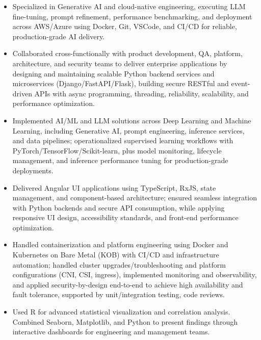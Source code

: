 \documentclass[11pt,letterpaper]{article}
\begin{document}
\begin{itemize}
  \item Specialized in Generative AI and cloud-native engineering, executing LLM fine-tuning, prompt
        refinement, performance benchmarking, and deployment across AWS/Azure using Docker, Git,
        VSCode, and CI/CD for reliable, production-grade AI delivery.

  \item Collaborated cross-functionally with product development, QA, platform, architecture, and
        security teams to deliver enterprise applications by designing and maintaining scalable Python
        backend services and microservices (Django/FastAPI/Flask), building secure RESTful and
        event-driven APIs with async programming, threading, reliability, scalability, and
        performance optimization.

  \item Implemented AI/ML and LLM solutions across Deep Learning and Machine Learning, including
        Generative AI, prompt engineering, inference services, and data pipelines; operationalized
        supervised learning workflows with PyTorch/TensorFlow/Scikit-learn, plus model monitoring,
        lifecycle management, and inference performance tuning for production-grade deployments.

  \item Delivered Angular UI applications using TypeScript, RxJS, state management, and
        component-based architecture; ensured seamless integration with Python backends and secure
        API consumption, while applying responsive UI design, accessibility standards, and
        front-end performance optimization.

  \item Handled containerization and platform engineering using Docker and Kubernetes on Bare Metal
        (KOB) with CI/CD and infrastructure automation; handled cluster upgrades/troubleshooting and
        platform configurations (CNI, CSI, ingress), implemented monitoring and observability, and
        applied security-by-design end-to-end to achieve high availability and fault tolerance,
        supported by unit/integration testing, code reviews.

  \item Used R for advanced statistical visualization and correlation analysis. Combined Seaborn,
        Matplotlib, and Python to present findings through interactive dashboards for engineering
        and management teams.
\end{itemize}
\end{document}
